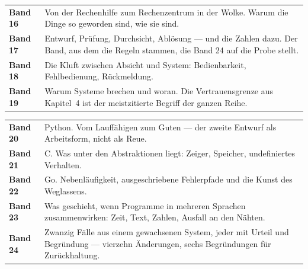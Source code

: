 \begin{merksatz}
\begin{center}
{\small
\renewcommand{\arraystretch}{1.42}
\begin{tabular}{@{}P{2.2cm}P{6.6cm}@{}}
\toprule
\textbf{Band 16} & Von der Rechenhilfe zum Rechenzentrum in der Wolke. Warum die Dinge so geworden sind, wie sie sind.\\
\textbf{Band 17} & Entwurf, Prüfung, Durchsicht, Ablösung --- und die Zahlen dazu. Der Band, aus dem die Regeln stammen, die Band 24 auf die Probe stellt.\\
\textbf{Band 18} & Die Kluft zwischen Absicht und System: Bedienbarkeit, Fehlbedienung, Rückmeldung.\\
\textbf{Band 19} & Warum Systeme brechen und woran. Die Vertrauensgrenze aus Kapitel~4 ist der meistzitierte Begriff der ganzen Reihe.\\
\bottomrule
\end{tabular}}
\end{center}
\end{merksatz}

\begin{merksatz}
\begin{center}
{\small
\renewcommand{\arraystretch}{1.42}
\begin{tabular}{@{}P{2.2cm}P{6.6cm}@{}}
\toprule
\textbf{Band 20} & Python. Vom Lauffähigen zum Guten --- der zweite Entwurf als Arbeitsform, nicht als Reue.\\
\textbf{Band 21} & C. Was unter den Abstraktionen liegt: Zeiger, Speicher, undefiniertes Verhalten.\\
\textbf{Band 22} & Go. Nebenläufigkeit, ausgeschriebene Fehlerpfade und die Kunst des Weglassens.\\
\textbf{Band 23} & Was geschieht, wenn Programme in mehreren Sprachen zusammenwirken: Zeit, Text, Zahlen, Ausfall an den Nähten.\\
\textbf{Band 24} & Zwanzig Fälle aus einem gewachsenen System, jeder mit Urteil und Begründung --- vierzehn Änderungen, sechs Begründungen für Zurückhaltung.\\
\bottomrule
\end{tabular}}
\end{center}

\begin{center}
\begin{minipage}{0.88\textwidth}
\end{minipage}
\end{center}
\end{merksatz}
